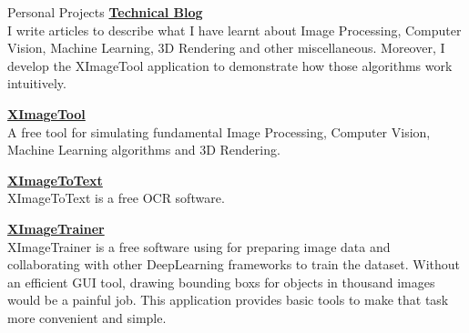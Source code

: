 \documentclass{resume}
\begin{document}
	\begin{rSection}{Personal Projects}
		{\bf \href{https://noidh.github.io/blog.html}{Technical Blog}}
		\\ I write articles to describe what I have learnt about Image Processing, Computer Vision, Machine Learning, 3D Rendering and other miscellaneous.  Moreover,  I develop the XImageTool application to demonstrate how those algorithms work intuitively.

		{\bf  \href{https://noidh.github.io/pages/sw/ximagetool/ximagetool.html}{XImageTool}}
		\\ A free tool for simulating fundamental Image Processing, Computer Vision, Machine Learning algorithms and 3D Rendering.

		{\bf \href{https://noidh.github.io/pages/sw/ximage2text/ximagetotext.html}{XImageToText}}
		\\ XImageToText is a free OCR software.

		{\bf \href{https://noidh.github.io/pages/sw/ximage_trainer/ximage_trainer.html}{XImageTrainer}}
		\\XImageTrainer is a free software using for preparing image data and collaborating with other DeepLearning frameworks to train the dataset. Without an efficient GUI tool, drawing bounding boxs for objects in thousand images would be a painful job.  This application provides basic tools to make that task more convenient and simple.	
	\end{rSection}
\end{document}
